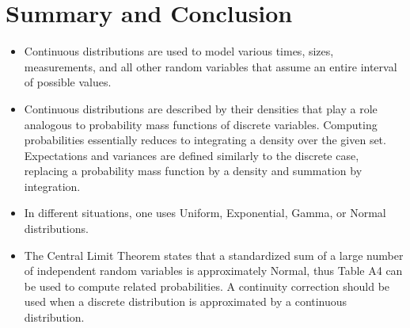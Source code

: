 \section{Summary and Conclusion}

\begin{itemize}
    \item Continuous distributions are used to model various times, sizes, measurements, and all other random variables that assume an entire interval of possible values.
    \item Continuous distributions are described by their densities that play a role analogous to probability mass functions of discrete variables. Computing probabilities essentially reduces to integrating a density over the given set. Expectations and variances are defined similarly to the discrete case, replacing a probability mass function by a density and summation by integration.
    \item In different situations, one uses Uniform, Exponential, Gamma, or Normal distributions.
    \item The Central Limit Theorem states that a standardized sum of a large number of independent random variables is approximately Normal, thus Table A4 can be used to compute related probabilities. A continuity correction should be used when a discrete distribution is approximated by a continuous distribution.
\end{itemize}